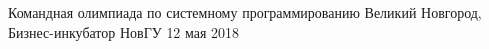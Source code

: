 \documentclass [11pt, a4paper, oneside] {article}
\begin{document}
\contest
{Командная олимпиада по системному программированию}%
{Великий Новгород, Бизнес-инкубатор НовГУ}%
{12 мая 2018}%


\renewcommand{\t}{\texttt}
\end{document}
